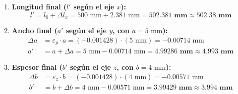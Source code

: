 \begin{enumerate}
    \item \textbf{Longitud final ($l'$ según el eje $x$):}
          \begin{equation}
              l' = l_0 + \Delta l_x = 500\text{ mm} + 2.381\text{ mm} = \mathbf{502.381\text{ mm} \approx 502.38\text{ mm}}
          \end{equation}
    \item \textbf{Ancho final ($a'$ según el eje $y$, con $a = 5\text{ mm}$):}
          \begin{align}
              \Delta a & = \varepsilon_y \cdot a = (-0.001428) \cdot (5\text{ mm}) = -0.00714\text{ mm}                        \\
              a'       & = a + \Delta a = 5\text{ mm} - 0.00714\text{ mm} = \mathbf{4.99286\text{ mm} \approx 4.993\text{ mm}}
          \end{align}
    \item \textbf{Espesor final ($b'$ según el eje $z$, con $b = 4\text{ mm}$):}
          \begin{align}
              \Delta b & = \varepsilon_z \cdot b = (-0.001428) \cdot (4\text{ mm}) = -0.00571\text{ mm}                        \\
              b'       & = b + \Delta b = 4\text{ mm} - 0.00571\text{ mm} = \mathbf{3.99429\text{ mm} \approx 3.994\text{ mm}}
          \end{align}
\end{enumerate}

\begin{table}[H]
    \centering
    \caption{Balance comparativo de dimensiones iniciales frente a finales en la barra traccionada.}
    \label{tab:dimensiones_finales_poisson}
\end{table}

